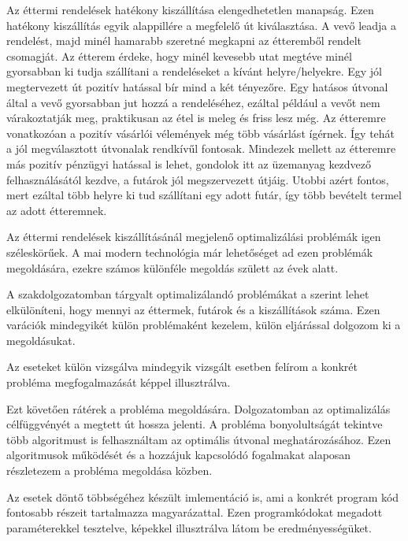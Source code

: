 
Az éttermi rendelések hatékony kiszállítása elengedhetetlen manapság. Ezen hatékony kiszállítás egyik alappillére a megfelelő út kiválasztása. A vevő leadja a rendelést, majd minél hamarabb szeretné megkapni az étteremből rendelt csomagját. Az étterem érdeke, hogy minél kevesebb utat megtéve minél gyorsabban ki tudja szállítani a rendeléseket a kívánt helyre/helyekre. Egy jól megtervezett út pozitív hatással bír mind a két tényezőre. Egy hatásos útvonal által a vevő gyorsabban jut hozzá a rendeléséhez, ezáltal például a vevőt nem várakoztatják meg, praktikusan az étel is meleg és friss lesz még. Az étteremre vonatkozóan a pozitív vásárlói vélemények még több vásárlást ígérnek. Így tehát a jól megválasztott útvonalak rendkívűl fontosak. Mindezek mellett az étteremre más pozitív pénzügyi hatással is lehet, gondolok itt az üzemanyag kezdvező felhasználásától kezdve, a futárok jól megszervezett útjáig. Utobbi azért fontos, mert ezáltal több helyre ki tud szállítani egy adott futár, így több bevételt termel az adott étteremnek.

Az éttermi rendelések kiszállításánál megjelenő optimalizálási problémák igen széleskörűek. A mai modern technológia már lehetőséget ad ezen problémák megoldására, ezekre számos különféle megoldás születt az évek alatt.

A szakdolgozatomban tárgyalt optimalizálandó problémákat a szerint lehet elkülöníteni, hogy mennyi az éttermek, futárok és a kiszállítások száma. Ezen varációk mindegyikét külön problémaként kezelem, külön eljárással dolgozom ki a megoldásukat.

Az eseteket külön vizsgálva mindegyik vizsgált esetben felírom a konkrét probléma megfogalmazását képpel illusztrálva.

Ezt követően rátérek a probléma megoldására. Dolgozatomban az optimalizálás célfüggvényét a megtett út hossza jelenti. A probléma bonyolultságát tekintve több algoritmust is felhasználtam az optimális útvonal meghatározásához. Ezen algoritmusok működését és a hozzájuk kapcsolódó fogalmakat alaposan részletezem a probléma megoldása közben.

Az esetek döntő többségéhez készült imlementáció is, ami a konkrét program kód fontosabb részeit tartalmazza magyarázattal.
Ezen programkódokat megadott paraméterekkel tesztelve, képekkel illusztrálva látom be eredményességüket.
